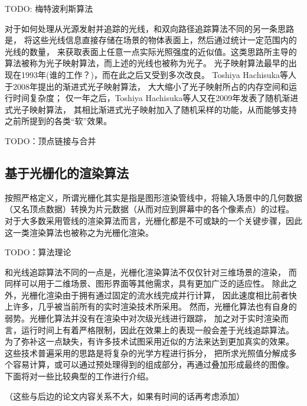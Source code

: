 TODO: 梅特波利斯算法

对于如何处理从光源发射并追踪的光线，和双向路径追踪算法不同的另一条思路是，
将这些光线信息直接存储在场景的物体表面上，然后通过统计一定范围内的光线的数量，
来获取表面上任意一点实际光照强度的近似值。这类思路所主导的算法被称为光子映射算法，而上述的光线也被称为光子。
光子映射算法最早的出现在1993年(谁的工作？)，而在此之后又受到多次改良。
Toshiya Hachisuka等人于2008年提出的渐进式光子映射算法\cite{ProgressivePhotonMapping}，
大大缩小了光子映射所占的内存空间和运行时间复杂度；
仅一年之后，Toshiya Hachisuka等人又在2009年发表了随机渐进式光子映射算法\cite{StochasticProgressivePhotonMapping}，
其相比渐进式光子映射加入了随机采样的功能，从而能够支持之前所提到的各类“软”效果。

TODO：顶点链接与合并


\subsection{基于光栅化的渲染算法}

按照严格定义，所谓光栅化其实是指是图形渲染管线中，将输入场景中的几何数据（又名顶点数据）转换为片元数据（从而对应到屏幕中的各个像素点）的过程。
对于大多数采用管线的渲染算法而言，光栅化都是不可或缺的一个关键步骤，因此这一类渲染算法也被称之为光栅化渲染。

TODO：算法理论

和光线追踪算法不同的一点是，光栅化渲染算法不仅仅针对三维场景的渲染，
而同样可以用于二维场景、图形界面等其他需求，具有更加广泛的适应性。
除此之外，光栅化渲染由于拥有通过固定的流水线完成并行计算，
因此速度相比前者快上许多，几乎被当前所有的实时渲染技术所采用。
然而，光栅化算法也有自身的弱势。光栅化算法并没有在渲染中对次级光线进行跟踪，
加之对于实时渲染而言，运行时间上有着严格限制，因此在效果上的表现一般会差于光线追踪算法。
为了弥补这一点缺失，有许多技术试图采用近似的方法来达到更加真实的效果。
这些技术普遍采用的思路是将复杂的光学方程进行拆分，
把所求光照值分解成多个容易计算，或可以通过预处理得到的组成部分，再通过叠加形成最终的图像。
下面将对一些比较典型的工作进行介绍。

（这些与后边的论文内容关系不大，如果有时间的话再考虑添加）

